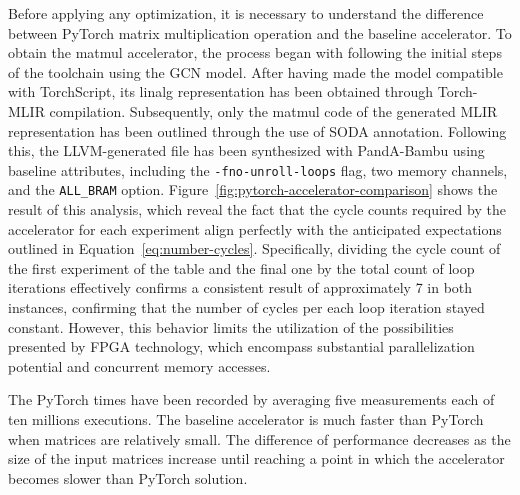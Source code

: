 Before applying any optimization, it is necessary to understand the difference between PyTorch matrix multiplication operation and the baseline accelerator.
To obtain the matmul accelerator, the process began with following the initial steps of the toolchain using the GCN model.
After having made the model compatible with TorchScript, its linalg representation has been obtained through Torch-MLIR compilation.
Subsequently, only the matmul code of the generated MLIR representation has been outlined through the use of SODA annotation.
Following this, the LLVM-generated file has been synthesized with PandA-Bambu using baseline attributes, including the \lstinline{-fno-unroll-loops} flag, two memory channels, and the \lstinline{ALL_BRAM} option.
Figure~\ref{fig:pytorch-accelerator-comparison} shows the result of this analysis, which reveal the fact that the cycle counts required by the accelerator for each experiment align perfectly with the anticipated expectations outlined in Equation~\ref{eq:number-cycles}.
Specifically, dividing the cycle count of the first experiment of the table and the final one by the total count of loop iterations effectively confirms a consistent result of approximately 7 in both instances, confirming that the number of cycles per each loop iteration stayed constant.
However, this behavior limits the utilization of the possibilities presented by FPGA technology, which encompass substantial parallelization potential and concurrent memory accesses.

The PyTorch times have been recorded by averaging five measurements each of ten millions executions.
The baseline accelerator is much faster than PyTorch when matrices are relatively small.
The difference of performance decreases as the size of the input matrices increase until reaching a point in which the accelerator becomes slower than PyTorch solution.

